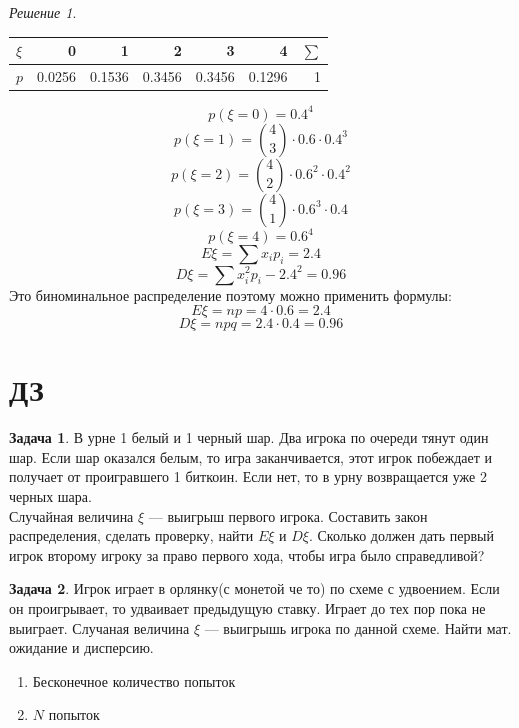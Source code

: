 \documentclass[english]{article}
\theoremstyle{plain}
\theoremstyle{remark}
\newtheorem*{solution}{Решение}
\theoremstyle{definition}
\newtheorem{task}{Задача}
\begin{document}
\begin{solution}
\-
\begin{center}
\begin{tabular}{l|rrrrrr}
\(\xi\) & 0 & 1 & 2 & 3 & 4 & \(\sum\)\\
\hline
\(p\) & 0.0256 & 0.1536 & 0.3456 & 0.3456 & 0.1296 & 1\\
\end{tabular}
\end{center}
\[ p(\xi = 0) = 0.4^4 \]
\[ p(\xi = 1) = \binom{4}{3} \cdot 0.6 \cdot 0.4^3 \]
\[ p(\xi = 2) = \binom{4}{2} \cdot 0.6^2 \cdot 0.4^2 \]
\[ p(\xi = 3) = \binom{4}{1} \cdot 0.6^3 \cdot 0.4 \]
\[ p(\xi = 4) = 0.6^4 \]
\[ E\xi = \sum x_i p_i = 2.4 \]
\[ D\xi = \sum x_i^2 p_i - 2.4^2 = 0.96 \]
Это биноминальное распределение поэтому можно применить формулы:
\[ E\xi = np = 4 \cdot 0.6 = 2.4 \]
\[ D\xi = npq = 2.4 \cdot 0.4 = 0.96 \]
\end{solution}
\section{ДЗ}
\label{sec:org33b5fcc}
\begin{task}
В урне 1 белый и 1 черный шар. Два игрока по очереди тянут один шар. Если шар оказался белым, то игра заканчивается, этот игрок побеждает и получает от проигравшего 1 биткоин. Если нет, то в урну возвращается уже 2 черных шара. \\
Случайная величина \(\xi\) --- выигрыш первого игрока. Составить закон распределения, сделать проверку, найти \(E\xi\) и \(D\xi\). Сколько должен дать первый игрок второму игроку за право первого хода, чтобы игра было справедливой?
\end{task}

\begin{task}
Игрок играет в орлянку(с монетой че то) по схеме с удвоением. Если он проигрывает, то удваивает предыдущую ставку. Играет до тех пор пока не выиграет. Случаная величина \(\xi\) --- выигрышь игрока по данной схеме. Найти мат. ожидание и дисперсию.
\begin{enumerate}
\item Бесконечное количество попыток
\item \(N\) попыток
\end{enumerate}
\end{task}
\end{document}
